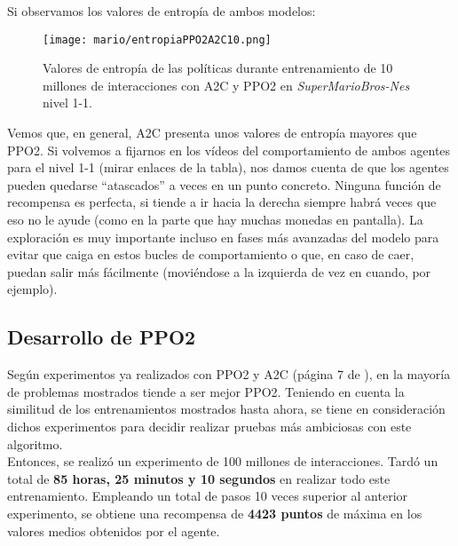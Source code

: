 \documentclass[11pt,fleqn]{book} %
\begin{document}
Si observamos los valores de entropía de ambos modelos:

\begin{figure}[H]
	\centering\texttt{[image: mario/entropiaPPO2A2C10.png]}
	\caption{Valores de entropía de las políticas durante entrenamiento de 10 millones de interacciones con A2C y PPO2 en \textit{SuperMarioBros-Nes} nivel 1-1.}
	\label{fig:entropiaSuper} %
\end{figure}

Vemos que, en general, A2C presenta unos valores de entropía mayores que PPO2. Si volvemos a fijarnos en los vídeos del comportamiento de ambos agentes para el nivel 1-1 (mirar enlaces de la tabla), nos damos cuenta de que los agentes pueden quedarse ``atascados'' a veces en un punto concreto. Ninguna función de recompensa es perfecta, si tiende a ir hacia la derecha siempre habrá veces que eso no le ayude (como en la parte que hay muchas monedas en pantalla). La exploración es muy importante incluso en fases más avanzadas del modelo para evitar que caiga en estos bucles de comportamiento o que, en caso de caer, puedan salir más fácilmente (moviéndose a la izquierda de vez en cuando, por ejemplo).

\subsection{Desarrollo de PPO2}

Según experimentos ya realizados con PPO2 y A2C (página 7 de \cite{article:PPO2}), en la mayoría de problemas mostrados tiende a ser mejor PPO2. Teniendo en cuenta la similitud de los entrenamientos mostrados hasta ahora, se tiene en consideración dichos experimentos para decidir realizar pruebas más ambiciosas con este algoritmo. \\


Entonces, se realizó un experimento de 100 millones de interacciones. Tardó un total de \textbf{85 horas, 25 minutos y 10 segundos} en realizar todo este entrenamiento. Empleando un total de pasos 10 veces superior al anterior experimento, se obtiene una recompensa de \textbf{4423 puntos} de máxima en los valores medios obtenidos por el agente.

\end{document}
